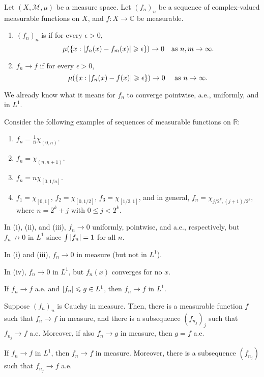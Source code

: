 \documentclass[12pt]{article}	%
\begin{document}
\begin{defn}
	Let $(X, \mathcal{M}, \mu)$ be a measure space. Let $(f_{n})_{n}$ be a sequence of complex-valued measurable functions on $X$, and $f : X \to \mathbb{C}$ be measurable.

	\begin{enumerate}
		\item $(f_{n})_{n}$ is  if for every $\epsilon > 0$,
		\begin{equation*} 
			\mu(\{x : {\left\lvert f_{n}(x) - f_{m}(x) \right\lvert} \geqslant \epsilon\}) \to 0 \quad \text{as $n, m \to \infty$}.
		\end{equation*}
		\item $f_{n} \to f$  if for every $\epsilon > 0$,
		\begin{equation*} 
			\mu(\{x : {\left\lvert f_{n}(x) - f(x) \right\lvert} \geqslant \epsilon\}) \to 0 \quad \text{ as $n \to \infty$}.
		\end{equation*}
	\end{enumerate}
\end{defn}

We already know what it means for $f_{n}$ to converge pointwise, a.e., uniformly, and in $L^{1}$.

\begin{ex}
	Consider the following examples of sequences of measurable functions on $\mathbb{R}$:
	\begin{enumerate}[label=(\roman*)]
		\item $f_{n} = \frac{1}{n} \chi_{(0, n)}$.
		\item $f_{n} = \chi_{(n, n + 1)}$.
		\item $f_{n} = n \chi_{[0, 1/n]}$.
		\item $f_{1} = \chi_{[0, 1]}$, $f_{2} = \chi_{[0, 1/2]}$, $f_{3} = \chi_{[1/2, 1]}$, and in general, $f_{n} = \chi_{j/2^{k}, (j + 1)/2^{k}}$, where $n = 2^{k} + j$ with $0 \le j < 2^{k}$.
	\end{enumerate}

	In (i), (ii), and (iii), $f_{n} \to 0$ uniformly, pointwise, and a.e., respectively, but $f_{n} \not\to 0$ in $L^{1}$ since $\int {\left\lvert f_{n} \right\lvert} = 1$ for all $n$. 

	In (i) and (iii), $f_{n} \to 0$ in measure (but not in $L^{1}$).

	In (iv), $f_{n} \to 0$ in $L^{1}$, but $f_{n}(x)$ converges for no $x$.
\end{ex}

\begin{prop}
	If $f_{n} \to f$ a.e. and ${\left\lvert f_{n} \right\lvert} \leqslant g \in L^{1}$, then $f_{n} \to f$ in $L^{1}$.

	Suppose $(f_{n})_{n}$ is Cauchy in measure. Then, there is a measurable function $f$ such that $f_{n} \to f$ in measure, and there is a subsequence $(f_{n_{j}})_{j}$ such that $f_{n_{j}} \to f$ a.e. Moreover, if also $f_{n} \to g$ in measure, then $g = f$ a.e.

	If $f_{n} \to f$ in $L^{1}$, then $f_{n} \to f$ in measure. Moreover, there is a subsequence $(f_{n_{j}})$ such that $f_{n_{j}} \to f$ a.e.
\end{prop}
\end{document}
